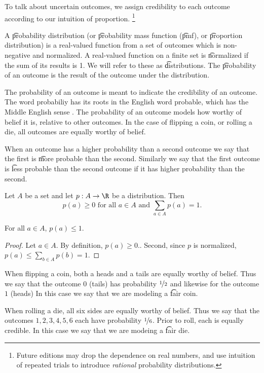 

To talk about uncertain outcomes, we assign credibility to each outcome according to our intuition of proportion.
  \ifhmode\unskip\fi\footnote{
Future editions may drop the dependence on real numbers, and use intuition of repeated trials to introduce \textit{rational} probability distributions.
  }


A \t{probability distribution} (or \t{probability mass function} (\t{pmf}), or \t{proportion distribution}) is a real-valued function from a set of outcomes which is non-negative and normalized.
A real-valued function on a finite set is \t{normalized} if the sum of its results is 1.
We will refer to these as \t{distributions}.
The \t{probability of an outcome} is the result of the outcome under the distribution.

The probability of an outcome is meant to indicate the credibility of an outcome.
The word probabiliy has its roots in the English word probable, which has the Middle English sense .
The probability of an outcome models how worthy of belief it is, relative to other outcomes.
In the case of flipping a coin, or rolling a die, all outcomes are equally worthy of belief.

When an outcome has a higher probability than a second outcome we say that the first is \t{more probable} than the second.
Similarly we say that the first outcome is \t{less probable} than the second outcome if it has higher probability than the second.


Let $A$ be a set and let $p: A \to \R $ be a distribution.
Then
  \[
\textstyle
p(a) \geq 0 \text{ for all } a \in A \text{ and } \sum_{a \in A} p(a) = 1.
  \]

\begin{proposition}
For all $a \in A$, $p(a) \leq 1$.
\begin{proof}
Let $a \in A$.
By definition, $p(a) \geq 0$..
Second, since $p$ is normalized, $p(a) \leq \sum_{b \in A} p(b) = 1$.
\end{proof}
\end{proposition}

When flipping a coin, both a heads and a tails are equally worthy of belief.
Thus we say that the outcome $0$ (tails) has probability $\nicefrac{1}{2}$ and likewise for the outcome $1$ (heads)
In this case we say that we are modeling a \t{fair coin}.

When rolling a die, all six sides are equally worthy of belief.
Thus we say that the outcomes $1, 2, 3, 4, 5, 6$ each have probability $\nicefrac{1}{6}$.
Prior to roll, each is equally credible.
In this case we say that we are modeing a \t{fair die}.
